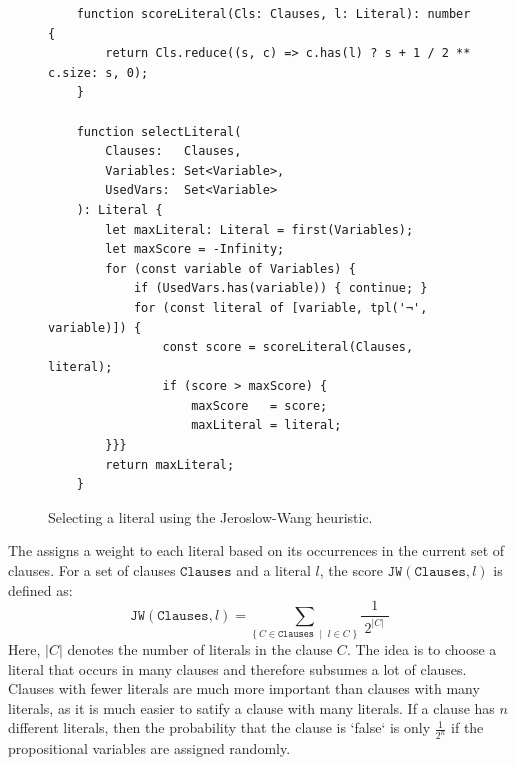\begin{figure}[!ht]
  \centering
\begin{verbatim}
    function scoreLiteral(Cls: Clauses, l: Literal): number {
        return Cls.reduce((s, c) => c.has(l) ? s + 1 / 2 ** c.size: s, 0);
    }
    
    function selectLiteral(
        Clauses:   Clauses,
        Variables: Set<Variable>,
        UsedVars:  Set<Variable>
    ): Literal {
        let maxLiteral: Literal = first(Variables);
        let maxScore = -Infinity;
        for (const variable of Variables) {
            if (UsedVars.has(variable)) { continue; }
            for (const literal of [variable, tpl('¬', variable)]) {
                const score = scoreLiteral(Clauses, literal);
                if (score > maxScore) {
                    maxScore   = score;
                    maxLiteral = literal;
        }}}    
        return maxLiteral;
    }
\end{verbatim}
\vspace*{-0.3cm}
  \caption{Selecting a literal using the Jeroslow-Wang heuristic.}
  \label{fig:selectLiteral}
\end{figure}
The  assigns a weight to each literal based on its occurrences in the current set of clauses. For a set of clauses $\texttt{Clauses}$ and a literal $l$, the score $\texttt{JW}(\texttt{Clauses}, l)$ is defined as:
$$ \texttt{JW}(\texttt{Clauses}, l) = \sum\limits_{\bigl\{\,C \in \texttt{Clauses}\;\mid\; l \in C\;\bigr\}} \frac{1}{\;2^{|C|}\;} $$
Here, $|C|$ denotes the number of literals in the clause $C$.
The idea is to choose a literal that occurs in many clauses and therefore subsumes a lot of clauses.  Clauses
with fewer literals are much more important than clauses with many literals, as it is much easier to satify a
clause with many literals.  If a clause has $n$ different literals, then the probability that the clause is
`false` is only $\displaystyle\frac{1}{2^n}$ if the propositional variables are assigned randomly. 


